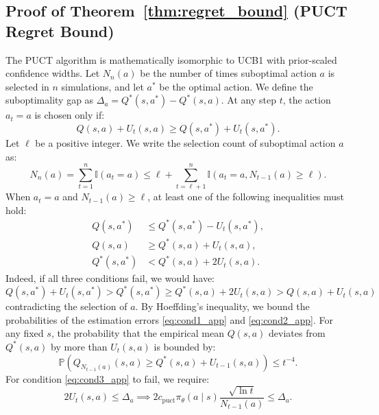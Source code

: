 \documentclass{article}
\begin{document}
\subsection{Proof of Theorem~\ref{thm:regret_bound} (PUCT Regret Bound)}\label{app:proof_regret_bound}
The PUCT algorithm is mathematically isomorphic to UCB1 with prior-scaled confidence widths. Let $N_n(a)$ be the number of times suboptimal action $a$ is selected in $n$ simulations, and let $a^*$ be the optimal action. We define the suboptimality gap as $\Delta_a = Q^*(s, a^*) - Q^*(s, a)$.
At any step $t$, the action $a_t = a$ is chosen only if:
\begin{equation}
    Q(s, a) + U_t(s, a) \geq Q(s, a^*) + U_t(s, a^*).
\end{equation}
Let $\ell$ be a positive integer. We write the selection count of suboptimal action $a$ as:
\begin{equation}
    N_n(a) = \sum_{t=1}^n \mathbb{I}(a_t = a) \leq \ell + \sum_{t=\ell+1}^n \mathbb{I}(a_t = a, N_{t-1}(a) \geq \ell).
\end{equation}
When $a_t = a$ and $N_{t-1}(a) \geq \ell$, at least one of the following inequalities must hold:
\begin{align}
    Q(s, a^*) &\leq Q^*(s, a^*) - U_t(s, a^*), \label{eq:cond1_app} \\
    Q(s, a) &\geq Q^*(s, a) + U_t(s, a), \label{eq:cond2_app} \\
    Q^*(s, a^*) &< Q^*(s, a) + 2 U_t(s, a). \label{eq:cond3_app}
\end{align}
Indeed, if all three conditions fail, we would have:
\begin{equation}
    Q(s, a^*) + U_t(s, a^*) > Q^*(s, a^*) \geq Q^*(s, a) + 2 U_t(s, a) > Q(s, a) + U_t(s, a)
\end{equation}
contradicting the selection of $a$.
By Hoeffding's inequality, we bound the probabilities of the estimation errors \eqref{eq:cond1_app} and \eqref{eq:cond2_app}. For any fixed $s$, the probability that the empirical mean $Q(s, a)$ deviates from $Q^*(s, a)$ by more than $U_t(s, a)$ is bounded by:
\begin{equation}
    \mathbb{P}(Q_{N_{t-1}(a)}(s, a) \geq Q^*(s, a) + U_{t-1}(s, a)) \leq t^{-4}.
\end{equation}
For condition \eqref{eq:cond3_app} to fail, we require:
\begin{equation}
    2 U_t(s, a) \leq \Delta_a \implies 2 c_{\mathrm{puct}} \pi_\theta(a \mid s) \frac{\sqrt{\ln t}}{N_{t-1}(a)} \leq \Delta_a.
\end{equation}
\end{document}
